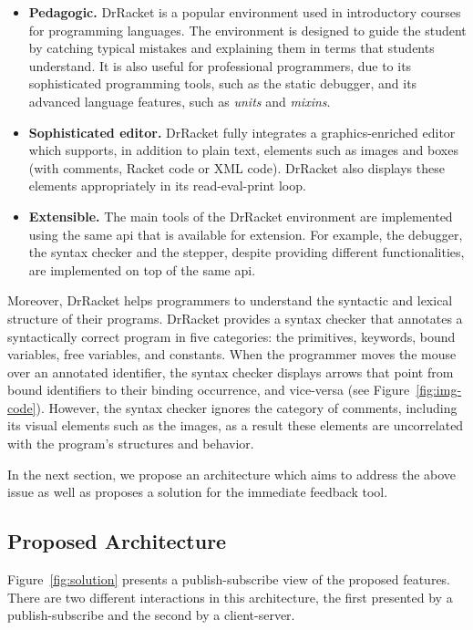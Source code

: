 \begin{itemize}
	\item \textbf{Pedagogic.} DrRacket is a popular environment used in introductory courses for programming languages. The environment is designed to guide the student by catching typical mistakes and explaining them in terms that students understand. It is also useful for professional programmers, due to its sophisticated programming tools, such as the static debugger, and its advanced language features, such as \textit{units} and \textit{mixins}.

	\item \textbf{Sophisticated editor.} DrRacket fully integrates a graphics-enriched editor which supports, in addition to plain text, elements such as images and boxes (with comments, Racket code or XML code). DrRacket also displays these elements appropriately in its read-eval-print loop.

	\item \textbf{Extensible.} The main tools of the DrRacket environment are implemented using the same \ac{api} that is available for extension. For example, the debugger, the syntax checker and the stepper, despite providing different functionalities, are implemented on top of the same \ac{api}.
\end{itemize}

Moreover, DrRacket helps programmers to understand the syntactic and lexical structure of their programs. DrRacket provides a syntax checker that annotates a syntactically correct program in five categories: the primitives, keywords, bound variables, free variables, and constants. When the programmer moves the mouse over an annotated identifier, the syntax checker displays arrows that point from bound identifiers to their binding occurrence, and vice-versa (see Figure~\ref{fig:img-code}). However, the syntax checker ignores the category of comments, including its visual elements such as the images, as a result these elements are uncorrelated with the program's structures and behavior.

In the next section, we propose an architecture which aims to address the above issue as well as proposes a solution for the immediate feedback tool.

\subsection{Proposed Architecture}

Figure~\ref{fig:solution} presents a publish-subscribe view of the proposed features. There are two different interactions in this architecture, the first presented by a publish-subscribe and the second by a client-server.


